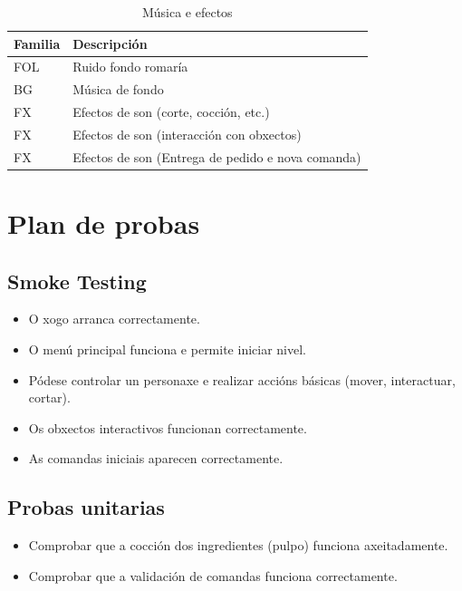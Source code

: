 \documentclass{report}  %
\begin{document}
\begin{table}[h]
    \centering
    \renewcommand{\arraystretch}{1.3} %
    \setlength{\tabcolsep}{10pt} %
    \label{tab:muxica}
    \begin{tabular}{|p{4cm}|p{9cm}|}
        \hline
        \rowcolor{octopus} %
        \textbf{Familia}  & \textbf{Descripción} \\
        \hline
        FOL & Ruido fondo romaría \\
        \hline
        BG & Música de fondo \\
        \hline
        FX & Efectos de son (corte, cocción, etc.) \\
        \hline
        FX & Efectos de son (interacción con obxectos) \\
        \hline
        FX & Efectos de son (Entrega de pedido e nova comanda) \\
        \hline
    \end{tabular}
    \caption{Música e efectos}
\end{table}

\section{Plan de probas}
\subsection{Smoke Testing}
\begin{itemize}
    \item O xogo arranca correctamente.
    \item O menú principal funciona e permite iniciar nivel.
    \item Pódese controlar un personaxe e realizar accións básicas (mover, interactuar, cortar).
    \item Os obxectos interactivos funcionan correctamente.
    \item As comandas iniciais aparecen correctamente.
\end{itemize}
\subsection{Probas unitarias}
\begin{itemize}
    \item Comprobar que a cocción dos ingredientes (pulpo) funciona axeitadamente.
    \item Comprobar que a validación de comandas funciona correctamente.
\end{itemize}
\end{document}
